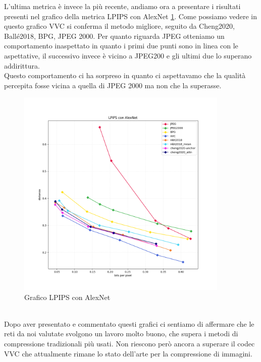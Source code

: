L’ultima metrica è invece la più recente, andiamo ora a presentare i risultati presenti nel grafico della metrica LPIPS con AlexNet \ref{fig:LPIPSGraph}. Come possiamo vedere in questo grafico VVC si conferma il metodo migliore, seguito da Cheng2020, Ballé2018, BPG, JPEG 2000. Per quanto riguarda JPEG otteniamo un comportamento inaspettato in quanto i primi due punti sono in linea con le aspettative, il successivo invece è vicino a JPEG200 e gli ultimi due lo superano addirittura.\\
Questo comportamento ci ha sorpreso in quanto ci aspettavamo che la qualità percepita fosse vicina a quella di JPEG 2000 ma non che la superasse.\\
\begin{figure}[!h]
    \centering
    \includegraphics[width=0.9\textwidth]{Immagini/METRICS/LPIPS.png}
    \caption{Grafico LPIPS con AlexNet}
    \label{fig:LPIPSGraph}
\end{figure}\\
Dopo aver presentato e commentato questi grafici ci sentiamo di affermare che le reti da noi valutate svolgono un lavoro molto buono, che supera i metodi di compressione tradizionali più usati. Non riescono però ancora a superare il codec VVC che attualmente rimane lo stato dell’arte per la compressione di immagini.\\
